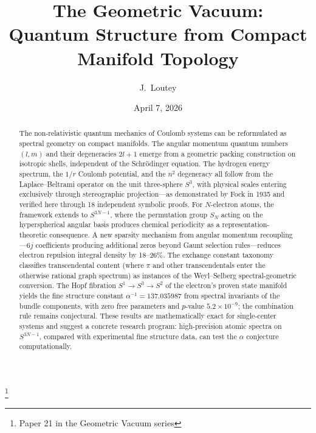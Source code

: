 \documentclass[aps,pra,twocolumn,superscriptaddress,longbibliography]{revtex4-2}
\begin{document}
\title{The Geometric Vacuum:\\
Quantum Structure from Compact Manifold Topology}
\thanks{Paper 21 in the Geometric Vacuum series}

\author{J.~Loutey}

\date{April 7, 2026}


\begin{abstract}
The non-relativistic quantum mechanics of Coulomb systems can be
reformulated as spectral geometry on compact manifolds.  The angular
momentum quantum numbers $(l, m)$ and their degeneracies $2l+1$ emerge
from a geometric packing construction on isotropic shells, independent
of the Schr\"odinger equation.  The hydrogen energy spectrum, the
$1/r$ Coulomb potential, and the $n^2$ degeneracy all follow from the
Laplace--Beltrami operator on the unit three-sphere $S^3$, with physical
scales entering exclusively through stereographic projection---as
demonstrated by Fock in 1935 and verified here through 18 independent
symbolic proofs.  For $N$-electron atoms, the framework extends to
$S^{3N-1}$, where the permutation group $S_N$ acting on the
hyperspherical angular basis produces chemical periodicity as a
representation-theoretic consequence.  A new sparsity mechanism from
angular momentum recoupling---6$j$ coefficients producing additional
zeros beyond Gaunt selection rules---reduces electron repulsion integral
density by 18--26\%.  The exchange constant taxonomy classifies
transcendental content (where $\pi$ and other transcendentals enter the
otherwise rational graph spectrum) as instances of the Weyl--Selberg
spectral-geometric conversion.  The Hopf fibration
$S^1 \to S^3 \to S^2$ of the electron's proven state manifold yields
the fine structure constant $\alpha^{-1} = 137.035987$ from spectral
invariants of the bundle components, with zero free parameters and
$p$-value $5.2 \times 10^{-9}$; the combination rule remains conjectural.
These results are mathematically exact for single-center systems and
suggest a concrete research program: high-precision atomic spectra on
$S^{3N-1}$, compared with experimental fine structure data, can test the
$\alpha$ conjecture computationally.
\end{abstract}

\maketitle
\end{document}
